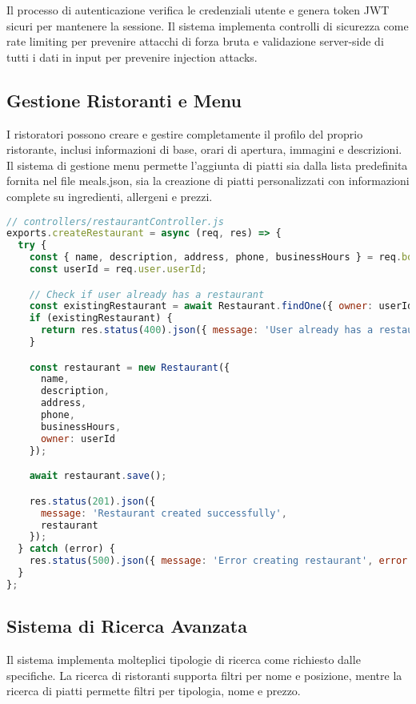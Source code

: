 \documentclass[12pt,a4paper]{article}
\begin{document}
Il processo di autenticazione verifica le credenziali utente e genera token JWT sicuri per mantenere la sessione. Il sistema implementa controlli di sicurezza come rate limiting per prevenire attacchi di forza bruta e validazione server-side di tutti i dati in input per prevenire injection attacks.

\subsection{Gestione Ristoranti e Menu}

I ristoratori possono creare e gestire completamente il profilo del proprio ristorante, inclusi informazioni di base, orari di apertura, immagini e descrizioni. Il sistema di gestione menu permette l'aggiunta di piatti sia dalla lista predefinita fornita nel file meals.json, sia la creazione di piatti personalizzati con informazioni complete su ingredienti, allergeni e prezzi.

\begin{lstlisting}[language=JavaScript, caption=Controller per la gestione ristoranti]
// controllers/restaurantController.js
exports.createRestaurant = async (req, res) => {
  try {
    const { name, description, address, phone, businessHours } = req.body;
    const userId = req.user.userId;

    // Check if user already has a restaurant
    const existingRestaurant = await Restaurant.findOne({ owner: userId });
    if (existingRestaurant) {
      return res.status(400).json({ message: 'User already has a restaurant' });
    }

    const restaurant = new Restaurant({
      name,
      description,
      address,
      phone,
      businessHours,
      owner: userId
    });

    await restaurant.save();

    res.status(201).json({
      message: 'Restaurant created successfully',
      restaurant
    });
  } catch (error) {
    res.status(500).json({ message: 'Error creating restaurant', error: error.message });
  }
};
\end{lstlisting}

\subsection{Sistema di Ricerca Avanzata}

Il sistema implementa molteplici tipologie di ricerca come richiesto dalle specifiche. La ricerca di ristoranti supporta filtri per nome e posizione, mentre la ricerca di piatti permette filtri per tipologia, nome e prezzo.
\end{document}
